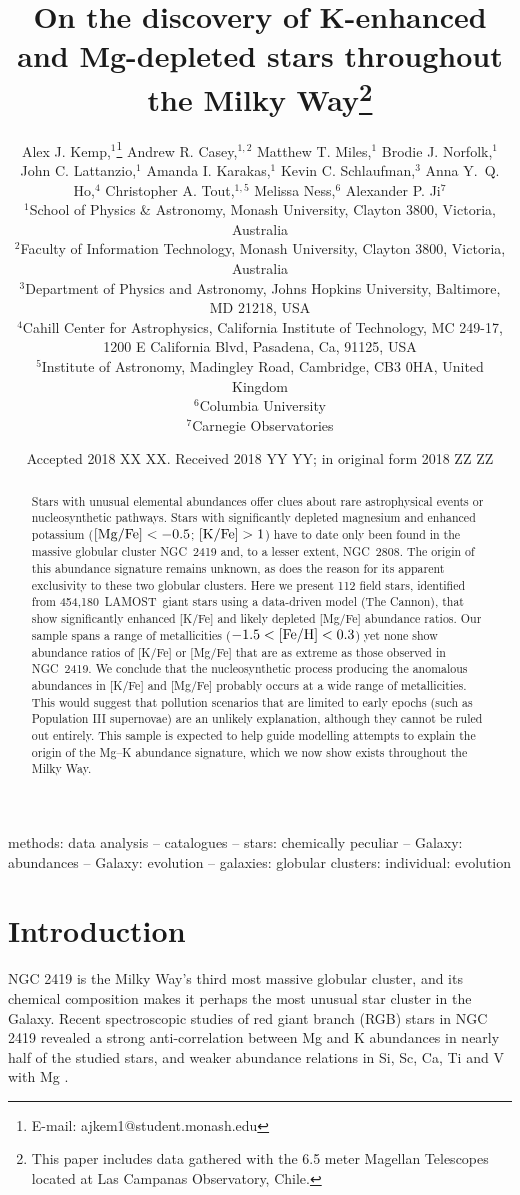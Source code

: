 \documentclass[a4paper,fleqn,usenatbib]{mnras}
\title[Mg--K stars in LAMOST]{On the discovery of K-enhanced and Mg-depleted stars throughout the Milky Way\footnote{This paper includes data gathered with the 6.5 meter Magellan Telescopes located at Las Campanas Observatory, Chile.}}
\author[Kemp et al.]{Alex J. Kemp,$^{1}$\thanks{E-mail: ajkem1@student.monash.edu}
Andrew R. Casey,$^{1,2}$
Matthew T. Miles,$^{1}$
Brodie J. Norfolk,$^{1}$\newauthor
John C. Lattanzio,$^{1}$
Amanda I. Karakas,$^{1}$
Kevin C. Schlaufman,$^{3}$
Anna Y.~Q. Ho,$^{4}$\newauthor
Christopher A. Tout,$^{1,5}$
Melissa Ness,$^{6}$
Alexander P. Ji$^{7}$
\\
$^{1}$School of Physics \& Astronomy, Monash University, Clayton 3800, Victoria, Australia\\
$^{2}$Faculty of Information Technology, Monash University, Clayton 3800, Victoria, Australia\\
$^{3}$Department of Physics and Astronomy, Johns Hopkins University, Baltimore, MD 21218, USA\\
$^{4}$Cahill Center for Astrophysics, California Institute of Technology, MC 249-17, 1200 E California Blvd, Pasadena, Ca, 91125, USA\\
$^{5}$Institute of Astronomy, Madingley Road, Cambridge, CB3 0HA, United Kingdom\\
$^{6}$Columbia University\\
$^{7}$Carnegie Observatories
}
\date{Accepted 2018 XX XX. Received 2018 YY YY; in original form 2018 ZZ ZZ}
\newcommand{\LamostGiants}{454,180}
\newcommand{\project}[1]{#1}
\newcommand{\lamost}{\project{LAMOST}}
\newcommand{\tc}{\project{The Cannon}}
\let\ACMmaketitle=\maketitle
\renewcommand{\maketitle}{\begingroup\let\footnote=\thanks \ACMmaketitle\endgroup}
\begin{document}
\label{firstpage}
\pagerange{\pageref{firstpage}--\pageref{lastpage}}
\maketitle


\begin{abstract}
Stars with unusual elemental abundances offer clues about rare astrophysical events or nucleosynthetic pathways. Stars with significantly depleted magnesium and enhanced potassium ($[{\rm Mg}/{\rm Fe}] < -0.5$; $[{\rm K}/{\rm Fe}] > 1$) have to date only been found in the massive globular cluster NGC~2419 and, to a lesser extent, NGC~2808. The origin of this abundance signature remains unknown, as does the reason for its apparent exclusivity to these two globular clusters. Here we present
112 field stars, identified from \LamostGiants\ \lamost\ giant stars using a data-driven model (\tc), that show significantly enhanced [K/Fe] and likely depleted [Mg/Fe] abundance ratios.
Our sample spans a range of metallicities ($-1.5 < [{\rm Fe}/{\rm H}] < 0.3$) yet none show abundance ratios of [K/Fe] or [Mg/Fe] that are as extreme as those observed in NGC~2419. 
We conclude that the nucleosynthetic process producing the anomalous abundances in [K/Fe] and [Mg/Fe] probably occurs at a wide range of metallicities. This would suggest that pollution scenarios that are limited to early epochs (such as Population III supernovae) are an unlikely explanation, although they cannot be ruled out entirely. This sample is expected to help guide modelling  attempts to explain the origin of the Mg--K abundance signature, which we now show exists throughout the Milky Way.
\end{abstract}

\begin{keywords}
methods: data analysis -- catalogues -- stars: chemically peculiar -- Galaxy: abundances -- Galaxy: evolution -- galaxies: globular clusters: individual: evolution
\end{keywords}



\section{Introduction}
\label{sec:intro}
NGC 2419 is the Milky Way's third most massive globular cluster, and its chemical composition makes it perhaps the most unusual star cluster in the Galaxy. Recent spectroscopic studies of red giant branch (RGB) stars in NGC 2419 revealed a strong anti-correlation between Mg and K abundances in nearly half of the studied stars, and weaker abundance relations in Si, Sc, Ca, Ti and V with Mg \citep{mucciarelli2012,cohenkirby2012}.
\end{document}
